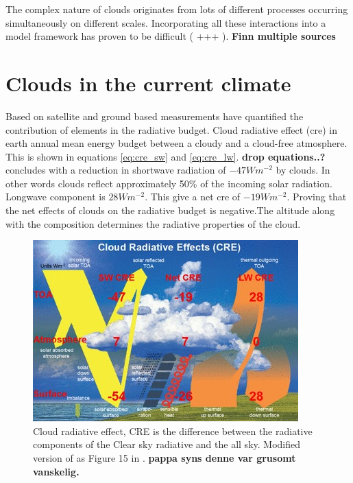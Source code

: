 The complex nature of clouds originates from lots of different processes occurring simultaneously on different scales. Incorporating all these interactions into a model framework has proven to be difficult (\cite{IPCC_CH9_climate_models} +++ ). \textbf{Finn multiple sources} 

\section{Clouds in the current climate} \label{sec:intro_cloud_current_climate}
Based on satellite and ground based measurements \cite{Wild2019TheModels} have quantified the contribution of elements in the radiative budget. Cloud radiative effect (\acrshort{cre}) in earth annual mean energy budget between a cloudy and a cloud-free atmosphere. This is shown in equations \eqref{eq:cre_sw} and \eqref{eq:cre_lw}. \textbf{drop equations..?}
\cite{Wild2019TheModels} concludes with a reduction in shortwave radiation of $-47Wm^{-2}$ by clouds. In other words clouds reflect approximately 50\% of the incoming solar radiation. Longwave component is $28Wm^{-2}$. This give a net \acrshort{cre} of $-19Wm^{-2}$. Proving that the net effects of clouds on the radiative budget is negative.The altitude along with the composition determines the radiative properties of the cloud. 

\begin{figure}[h]
    \centering
    \includegraphics[scale = 7]{Chapter1_Intro/images/CRE_wild2019.jpg}
    \caption{Cloud radiative effect, CRE is the difference between the radiative components of the Clear sky radiative and the all sky. Modified version of as Figure 15 in \cite{Wild2019TheModels}. \textbf{pappa syns denne var grusomt vanskelig.}}
    \label{fig:cre}
\end{figure}

